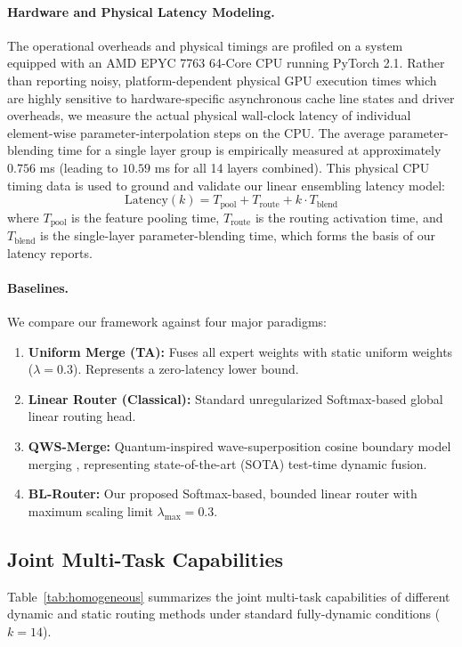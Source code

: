 \paragraph{Hardware and Physical Latency Modeling.}
The operational overheads and physical timings are profiled on a system equipped with an AMD EPYC 7763 64-Core CPU running PyTorch 2.1. Rather than reporting noisy, platform-dependent physical GPU execution times which are highly sensitive to hardware-specific asynchronous cache line states and driver overheads, we measure the actual physical wall-clock latency of individual element-wise parameter-interpolation steps on the CPU. The average parameter-blending time for a single layer group is empirically measured at approximately $0.756$ ms (leading to $10.59$ ms for all 14 layers combined). This physical CPU timing data is used to ground and validate our linear ensembling latency model:
\begin{equation}
    \text{Latency}(k) = T_{\text{pool}} + T_{\text{route}} + k \cdot T_{\text{blend}}
\end{equation}
where $T_{\text{pool}}$ is the feature pooling time, $T_{\text{route}}$ is the routing activation time, and $T_{\text{blend}}$ is the single-layer parameter-blending time, which forms the basis of our latency reports.

\paragraph{Baselines.}
We compare our framework against four major paradigms:
\begin{enumerate}
    \item \textbf{Uniform Merge (TA):} Fuses all expert weights with static uniform weights ($\lambda = 0.3$). Represents a zero-latency lower bound.
    \item \textbf{Linear Router (Classical):} Standard unregularized Softmax-based global linear routing head.
    \item \textbf{QWS-Merge:} Quantum-inspired wave-superposition cosine boundary model merging \cite{qwsmerge}, representing state-of-the-art (SOTA) test-time dynamic fusion.
    \item \textbf{BL-Router:} Our proposed Softmax-based, bounded linear router with maximum scaling limit $\lambda_{\text{max}} = 0.3$.
\end{enumerate}

\subsection{Joint Multi-Task Capabilities}
Table~\ref{tab:homogeneous} summarizes the joint multi-task capabilities of different dynamic and static routing methods under standard fully-dynamic conditions ($k=14$).

